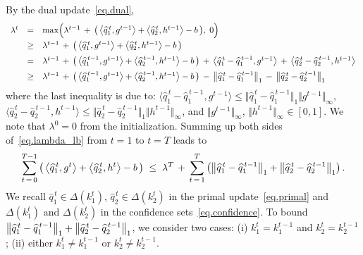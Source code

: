 \documentclass[12pt, final]{l4dc2023}
\begin{document}
By the dual update~\eqref{eq.dual},
\begin{equation}\label{eq.lambda_lb}
\begin{array}{rcl}
\lambda^{t} &=& \max\! \Big( \lambda^{t-1} \,+\, \big(\left\langle \widehat q_1^{\,t},g^{t-1} \right\rangle +\left\langle \widehat q_2^{\,t},h^{t-1} \right\rangle-b\, \big),\; 0 \Big)
\\[0.2cm]
&\geq &  \lambda^{t-1} \,+\, \big(\left\langle \widehat q_1^{\,t},g^{t-1} \right\rangle +\left\langle \widehat q_2^{\,t},h^{t-1} \right\rangle-b\, \big)
\\[0.2cm]
&= &  \lambda^{t-1} \,+\, \big(\left\langle \widehat q_1^{\,t-1},g^{t-1} \right\rangle +\left\langle \widehat q_2^{\,t-1},h^{t-1} \right\rangle-b\, \big)\,+\, \left\langle \widehat q_1^{\,t} - \widehat q_1^{\,t-1},g^{t-1} \right\rangle \,+\,\left\langle \widehat q_2^{\,t}-\widehat q_2^{\,t-1},h^{t-1} \right\rangle
\\[0.2cm]
&\geq &  \lambda^{t-1} \,+\, \big(\left\langle \widehat q_1^{\,t-1},g^{t-1} \right\rangle +\left\langle \widehat q_2^{\,t-1},h^{t-1} \right\rangle-b\, \big)\,-\, \left\|{\widehat q_1^{\,t} - \widehat q_1^{\,t-1}}\right\|_1 \,-\,\left\|{\widehat q_2^{\,t}-\widehat q_2^{\,t-1}}\right\|_1
\end{array}
\end{equation}
where the last inequality is due to: $\langle{\hat q_1^{\,t} - \hat q_1^{\,t-1}},{g^{t-1}}\rangle\leq \Vert \hat q_1^{\,t} - \hat q_1^{\,t-1}\Vert_1 \Vert g^{t-1}\Vert_\infty$, $\langle{\hat q_2^{\,t} - \hat q_2^{\,t-1}},{h^{t-1}}\rangle\leq \Vert \hat q_2^{\,t} - \hat q_2^{\,t-1}\Vert_1 \Vert h^{t-1}\Vert_\infty$, and $\Vert g^{t-1}\Vert_\infty$, $\Vert h^{t-1}\Vert_\infty\in [0,1]$. We note that $\lambda^0=0$ from the initialization. Summing up both sides of~\eqref{eq.lambda_lb} from $t=1$ to $t=T$ leads to
\begin{equation}\label{eq.violation_dqq}
\sum_{t\,=\,0}^{T-1} \big(\left\langle \widehat q_1^{\,t},g^{t} \right\rangle +\left\langle \widehat q_2^{\,t},h^{t} \right\rangle-b\, \big)
\;\leq\; 
\lambda^T
\,+\, 
\sum_{t\,=\,1}^{T} \left(
	\left\|{\widehat q_1^{\,t} - \widehat q_1^{\,t-1}}\right\|_1 
	+\left\|{\widehat q_2^{\,t}-\widehat q_2^{\,t-1}}\right\|_1\right).
\end{equation}
We recall $ \hat q_1^{\,t}\in \Delta(k_1^t)$, $ \hat q_2^{\,t}\in \Delta(k_2^t)$ in the primal update~\eqref{eq.primal} and $\Delta(k_1^t)$ and $\Delta(k_2^t)$ in the confidence sets~\eqref{eq.confidence}.
To bound $\left\|{\widehat q_1^{\,t} - \widehat q_1^{\,t-1}}\right\|_1 
+\left\|{\widehat q_2^{\,t}-\widehat q_2^{\,t-1}}\right\|_1$, we consider two cases: (i) $k_1^t = k_1^{t-1}$ and $k_2^t = k_2^{t-1}$; (ii) either $k_1^t \neq k_1^{t-1}$ or $k_2^t \neq k_2^{t-1}$.
\end{document}
